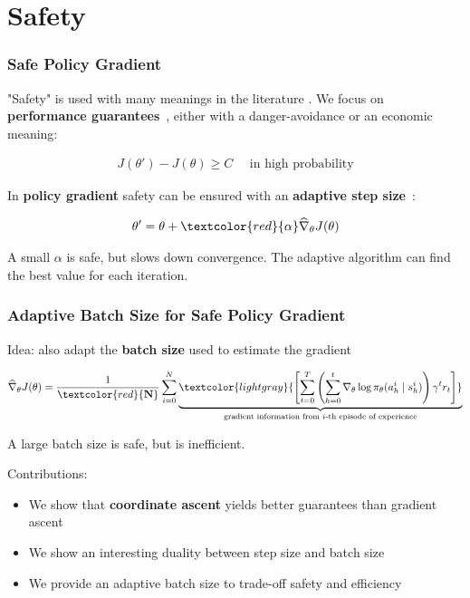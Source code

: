 \documentclass{beamer}
\begin{document}
\section{Safety}


\begin{frame}
\frametitle{Safe Policy Gradient}

"Safety" is used with many meanings in the literature \cite{garcia2015comprehensive}. We focus on \textbf{performance guarantees}~\cite{kakade2002approximately, thomas2015high}, either with a danger-avoidance or an economic meaning:

\begin{align*}
	J(\theta') - J(\theta) \geq C \quad\text{ in high probability}
\end{align*}

In \textbf{policy gradient} safety can be ensured with an \textbf{adaptive step size}~\cite{pirotta2013adaptive}:

\begin{align*}
	\theta' = \theta + \textcolor{red}{\mathbf{\alpha}}\widehat{\nabla}_{\theta}J(\theta)
\end{align*}

A small $\alpha$ is safe, but slows down convergence. The adaptive algorithm can find the best value for each iteration. 

\end{frame}


\begin{frame}
\frametitle{Adaptive Batch Size for Safe Policy Gradient~\cite{papini2017adaptive}}
Idea: also adapt the \textbf{batch size} used to estimate the gradient

\begin{align*}
	\widehat{\nabla}_{\theta}J(\theta) = \frac{1}{\textcolor{red}{\mathbf{N}}}\sum_{i=0}^{N}\underbrace{\textcolor{lightgray}{\left[\sum_{t=0}^T\left(\sum_{h=0}^t\nabla_{\theta}\log\pi_{\theta}(a_h^i\mid s_h^i)\right) \gamma^tr_t\right]}}_{\text{gradient information from $i$-th episode of experience}}
\end{align*}

A large batch size is safe, but is inefficient.

\vfill

Contributions:
\begin{itemize}
	\item We show that \textbf{coordinate ascent} yields better guarantees than gradient ascent
	\item We show an interesting duality between step size and batch size
	\item We provide an adaptive batch size to trade-off safety and efficiency
\end{itemize}

\end{frame}
\end{document}
